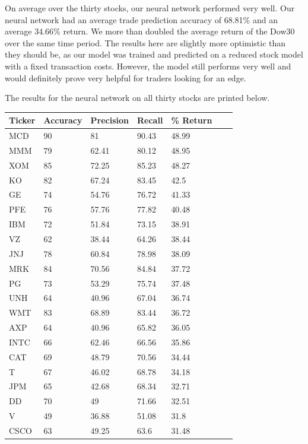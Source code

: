 \documentclass{article}
\begin{document}
On average over the thirty stocks, our neural network performed very well. Our neural network had an average trade prediction accuracy of 68.81\% and an average 34.66\% return. We more than doubled the average return of the Dow30 over the same time period. The results here are slightly more optimistic than they should be, as our model was trained and predicted on a reduced stock model with a fixed transaction costs. However, the model still performs very well and would definitely prove very helpful for traders looking for an edge.

The results for the neural network on all thirty stocks are printed below.

\begin{table}[h]
  \begin{tabular}{@{}lllllll@{}}
    \toprule
    Ticker & Accuracy & Precision & Recall & \% Return & \\ \midrule
    MCD & 90 & 81 & 90.43 & 48.99 & \\
    MMM & 79 & 62.41 & 80.12 & 48.95 & \\
    XOM & 85 & 72.25 & 85.23 & 48.27 & \\
    KO & 82 & 67.24 & 83.45 & 42.5 & \\
    GE & 74 & 54.76 & 76.72 & 41.33 & \\
    PFE & 76 & 57.76 & 77.82 & 40.48 & \\
    IBM & 72 & 51.84 & 73.15 & 38.91 & \\
    VZ & 62 & 38.44 & 64.26 & 38.44 & \\
    JNJ & 78 & 60.84 & 78.98 & 38.09 & \\
    MRK & 84 & 70.56 & 84.84 & 37.72 & \\
    PG & 73 & 53.29 & 75.74 & 37.48 & \\
    UNH & 64 & 40.96 & 67.04 & 36.74 & \\
    WMT & 83 & 68.89 & 83.44 & 36.72 & \\
    AXP & 64 & 40.96 & 65.82 & 36.05 & \\
    INTC & 66 & 62.46 & 66.56 & 35.86 & \\
    CAT & 69 & 48.79 & 70.56 & 34.44 & \\
    T & 67 & 46.02 & 68.78 & 34.18 & \\
    JPM & 65 & 42.68 & 68.34 & 32.71 & \\
    DD & 70 & 49 & 71.66 & 32.51 & \\
    V & 49 & 36.88 & 51.08 & 31.8 & \\
    CSCO & 63 & 49.25 & 63.6 & 31.48 & \\

\end{tabular}
\end{table}
\end{document}
